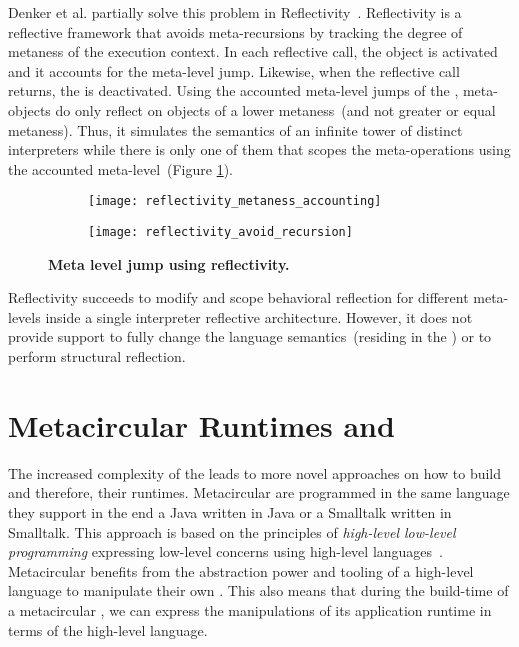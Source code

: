 Denker et al. partially solve this problem in Reflectivity~\cite{Denk08b}. Reflectivity is a reflective framework that avoids meta-recursions by tracking the degree of metaness of the execution context. In each reflective call, the  object is activated and it accounts for the meta-level jump. Likewise, when the reflective call returns, the  is deactivated. Using the accounted meta-level jumps of the , meta-objects do only reflect on objects of a lower metaness~(and not greater or equal metaness). Thus, it simulates the semantics of an infinite tower of distinct interpreters while there is only one of them that scopes the meta-operations using the accounted meta-level~(Figure \ref{fig:reflectivity_avoid_meta_recursion}).

\begin{figure}[ht]
\begin{center}
\begin{subfigure}{.45\textwidth}
\texttt{[image: reflectivity\_metaness\_accounting]}
\end{subfigure}
\begin{subfigure}{.45\textwidth}
\texttt{[image: reflectivity\_avoid\_recursion]}
\end{subfigure}
\caption{\textbf{Meta level jump using reflectivity.}\label{fig:reflectivity_avoid_meta_recursion}
 }
\end{center}
\end{figure}

Reflectivity succeeds to modify and scope behavioral reflection for different meta-levels inside a single interpreter reflective architecture. However, it does not provide support to fully change the language semantics~(residing in the \VM) or to perform structural reflection.

\section{Metacircular Runtimes and \VMs}\label{sec:metacircular_runtimes}

The increased complexity of the \VMs leads to more novel approaches on how to build \VMs and therefore, their runtimes.
Metacircular \VMs are \VMs programmed in the same language they support in the end \eg a Java \VM written in Java or a Smalltalk \VM written in Smalltalk. This approach is based on the principles of \emph{high-level low-level programming} \ie expressing low-level concerns using high-level languages~\cite{Fram09a}. Metacircular \VMs benefits from the abstraction power and tooling of a high-level language to manipulate their own \VMs. This also means that during the build-time of a metacircular \VM, we can express the manipulations of its application runtime in terms of the high-level language.

